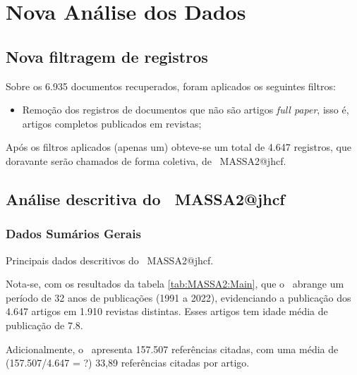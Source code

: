 \section{Nova Análise dos Dados}

\subsection{Nova filtragem de registros}

Sobre os 6.935 documentos recuperados, foram  aplicados os seguintes filtros:
\begin{itemize}
    \item Remoção dos registros de documentos que não são artigos \textit{full paper}, isso é, artigos completos publicados em revistas;
\end{itemize}

Após os filtros aplicados (apenas um)  obteve-se um total de 4.647 registros, que doravante serão chamados de forma coletiva, de \dataset\   MASSA2@jhcf.

\subsection{Análise descritiva do \dataset\   MASSA2@jhcf}

\subsubsection{Dados Sumários Gerais}

\begin{table}[htp]
    \centering
{}
    \caption{Principais dados descritivos do \dataset\   MASSA2@jhcf.}
    \label{tab:MASSA2:Main}
\end{table}

Nota-se, com os resultados da tabela \ref{tab:MASSA2:Main}, que o \dataset\   abrange um período de 32 anos de publicações (1991 a 2022), evidenciando  a publicação dos 4.647 artigos em 1.910 revistas distintas. Esses artigos tem idade média de publicação de 7.8.

Adicionalmente, o \dataset\ apresenta 157.507 referências citadas, com uma média de (157.507/4.647 = ?) 33,89 referências citadas por artigo.

